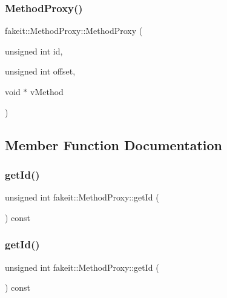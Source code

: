 \subsubsection{\texorpdfstring{MethodProxy()}{MethodProxy()}\hspace{0.1cm}{\footnotesize\ttfamily [9/9]}}
{\footnotesize\ttfamily fakeit\+::\+Method\+Proxy\+::\+Method\+Proxy (\begin{DoxyParamCaption}\item[{unsigned int}]{id,  }\item[{unsigned int}]{offset,  }\item[{void $\ast$}]{v\+Method }\end{DoxyParamCaption})\hspace{0.3cm}{\ttfamily [inline]}}



\subsection{Member Function Documentation}
\mbox{\label{structfakeit_1_1MethodProxy_a00370ab06d9c4f4b9affb9ec3bdd72fe}} 
\subsubsection{\texorpdfstring{getId()}{getId()}\hspace{0.1cm}{\footnotesize\ttfamily [1/9]}}
{\footnotesize\ttfamily unsigned int fakeit\+::\+Method\+Proxy\+::get\+Id (\begin{DoxyParamCaption}{ }\end{DoxyParamCaption}) const\hspace{0.3cm}{\ttfamily [inline]}}

\mbox{\label{structfakeit_1_1MethodProxy_a00370ab06d9c4f4b9affb9ec3bdd72fe}} 
\subsubsection{\texorpdfstring{getId()}{getId()}\hspace{0.1cm}{\footnotesize\ttfamily [2/9]}}
{\footnotesize\ttfamily unsigned int fakeit\+::\+Method\+Proxy\+::get\+Id (\begin{DoxyParamCaption}{ }\end{DoxyParamCaption}) const\hspace{0.3cm}{\ttfamily [inline]}}

